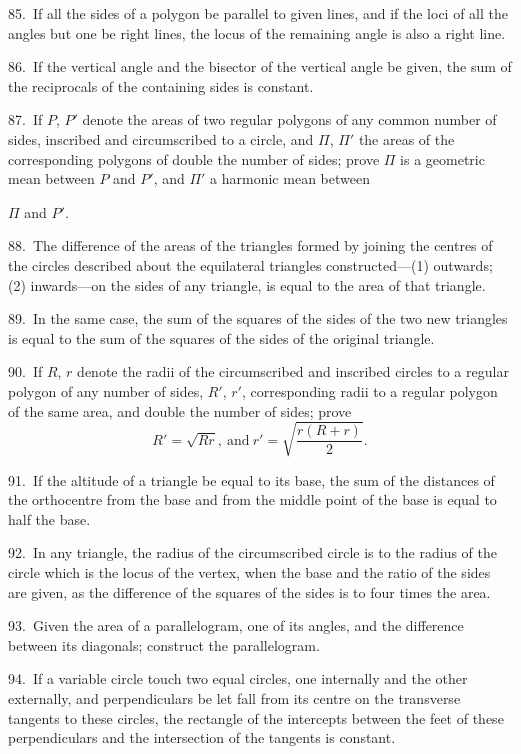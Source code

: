 \documentclass[oneside]{book}
\begin{document}
\begin{footnotesize}
85.~If all the sides of a polygon be parallel to given lines, and
if the loci of all the angles but one be right lines, the locus of the
remaining angle is also a right line.

86.~If the vertical angle and the bisector of the vertical angle
be given, the sum of the reciprocals of the containing sides is
constant.

87.~If $P$, $P'$ denote the areas of two regular polygons of any
common number of sides, inscribed and circumscribed to a circle,
and $\Pi$, $\Pi'$ the areas of the corresponding polygons of double the
number of sides; prove $\Pi$ is a geometric mean between $P$ and $P'$,
and $\Pi'$ a harmonic mean between

$\Pi$ and $P'$.

88.~The difference of the areas of the triangles formed by joining
the centres of the circles described about the equilateral triangles
constructed---(1) outwards; (2) inwards---on the sides of
any triangle, is equal to the area of that triangle.


89.~In the same case, the sum of the squares of the sides of
the two new triangles is equal to the sum of the squares of the
sides of the original triangle.

90.~If $R$, $r$ denote the radii of the circumscribed and inscribed
circles to a regular polygon of any number of sides, $R'$, $r'$, corresponding
radii to a regular polygon of the same area, and double
the number of sides; prove
\[
R' = \sqrt{Rr},\ \text{and}\ r' = \sqrt{\frac{r(R+r)}{2}}.
\]

91.~If the altitude of a triangle be equal to its base, the sum
of the distances of the orthocentre from the base and from the
middle point of the base is equal to half the base.

92.~In any triangle, the radius of the circumscribed circle is to
the radius of the circle which is the locus of the vertex, when
the base and the ratio of the sides are given, as the difference of
the squares of the sides is to four times the area.

93.~Given the area of a parallelogram, one of its angles, and
the difference between its diagonals; construct the parallelogram.

94.~If a variable circle touch two equal circles, one internally
and the other externally, and perpendiculars be let fall from its
centre on the transverse tangents to these circles, the rectangle of
the intercepts between the feet of these perpendiculars and the
intersection of the tangents is constant.


\end{footnotesize}
\end{document}
